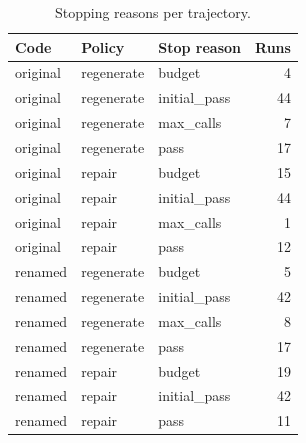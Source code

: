 \begin{table}[t]
\centering\small
\caption{Stopping reasons per trajectory.}
\label{tab:stops}
\begin{tabular}{lllr}
\toprule
Code & Policy & Stop reason & Runs \\
\midrule
original & regenerate & budget & 4 \\
original & regenerate & initial\_pass & 44 \\
original & regenerate & max\_calls & 7 \\
original & regenerate & pass & 17 \\
original & repair & budget & 15 \\
original & repair & initial\_pass & 44 \\
original & repair & max\_calls & 1 \\
original & repair & pass & 12 \\
renamed & regenerate & budget & 5 \\
renamed & regenerate & initial\_pass & 42 \\
renamed & regenerate & max\_calls & 8 \\
renamed & regenerate & pass & 17 \\
renamed & repair & budget & 19 \\
renamed & repair & initial\_pass & 42 \\
renamed & repair & pass & 11 \\
\bottomrule
\end{tabular}
\end{table}
